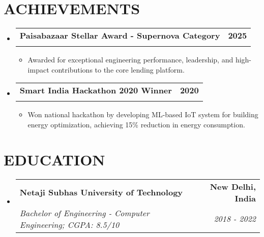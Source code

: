 \documentclass{fonts}
\makeatletter
\newcommand{\resumeSubheading}[4]{
  \vspace{-2pt}\item
    \begin{tabular*}{1.0\textwidth}[t]{l@{\extracolsep{\fill}}r}
      \textbf{\large#1} & \textbf{\small #2} \\
      \textit{\large#3} & \textit{\small #4} \\
    \end{tabular*}\vspace{-7pt}
}
\newcommand{\resumeItem}[1]{
  \item\small{
    {#1 \vspace{-2pt}}
  }
}
\newcommand{\resumeSubHeadingListStart}{\begin{itemize}[leftmargin=0.0in, label={}]}
\newcommand{\resumeSubHeadingListEnd}{\end{itemize}}
\newcommand{\resumeItemListStart}{\begin{itemize}}
\newcommand{\resumeItemListEnd}{\end{itemize}\vspace{-5pt}}
\makeatother
\begin{document}
\section{ACHIEVEMENTS}
  \resumeSubHeadingListStart
  \resumeSubheading
      {Paisabazaar Stellar Award - Supernova Category}{2025}{}{}
      \vspace{-15pt}
      \resumeItemListStart
    \resumeItem{Awarded for exceptional engineering performance, leadership, and high-impact contributions to the core lending platform.}
\resumeItemListEnd
    \resumeSubheading
      {Smart India Hackathon 2020 Winner}{2020}{}{}
      \vspace{-15pt}
      \resumeItemListStart
        \resumeItem{Won national hackathon by developing ML-based IoT system for building energy optimization, achieving 15\% reduction in energy consumption.}
      \resumeItemListEnd
  \resumeSubHeadingListEnd

\section{EDUCATION}
  \resumeSubHeadingListStart
    \resumeSubheading
      {Netaji Subhas University of Technology}{New Delhi, India}
      {Bachelor of Engineering - Computer Engineering; CGPA: 8.5/10}{2018 - 2022}
  \resumeSubHeadingListEnd
\end{document}
